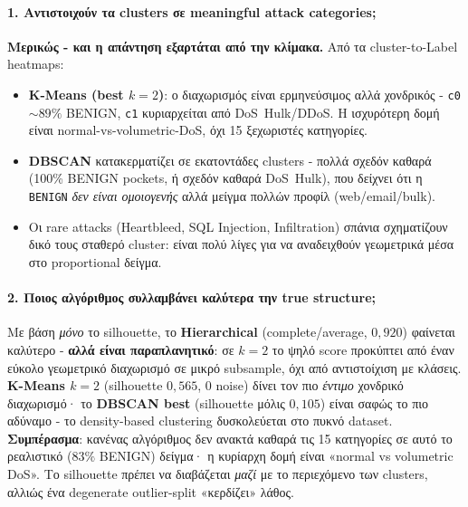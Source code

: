 \documentclass[12pt,a4paper,twoside]{book}
\begin{document}
\paragraph{1. Αντιστοιχούν τα clusters σε meaningful attack categories;}
\textbf{Μερικώς - και η απάντηση εξαρτάται από την κλίμακα.} Από τα
cluster-to-Label heatmaps:
\begin{itemize}
    \item \textbf{K-Means (best \(k=2\))}: ο διαχωρισμός είναι
    ερμηνεύσιμος αλλά χονδρικός - \texttt{c0} \(\sim 89\%\) BENIGN, \texttt{c1}
    κυριαρχείται από DoS~Hulk/DDoS. Η ισχυρότερη δομή είναι
    normal-vs-volumetric-DoS, όχι 15 ξεχωριστές κατηγορίες.
    \item \textbf{DBSCAN} κατακερματίζει σε εκατοντάδες clusters - πολλά
    σχεδόν καθαρά (100\% BENIGN pockets, ή σχεδόν καθαρά DoS~Hulk), που
    δείχνει ότι η \texttt{BENIGN} \emph{δεν είναι ομοιογενής} αλλά μείγμα
    πολλών προφίλ (web/email/bulk).
    \item Οι rare attacks (Heartbleed, SQL Injection, Infiltration)
    σπάνια σχηματίζουν δικό τους σταθερό cluster: είναι πολύ λίγες για να
    αναδειχθούν γεωμετρικά μέσα στο proportional δείγμα.
\end{itemize}

\paragraph{2. Ποιος αλγόριθμος συλλαμβάνει καλύτερα την true structure;}
Με βάση \emph{μόνο} το silhouette, το \textbf{Hierarchical}
(complete/average, \(0{,}920\)) φαίνεται καλύτερο - \textbf{αλλά είναι
παραπλανητικό}: σε \(k=2\) το ψηλό score προκύπτει από έναν εύκολο
γεωμετρικό διαχωρισμό σε μικρό subsample, όχι από αντιστοίχιση με κλάσεις.
\textbf{K-Means \(k=2\)} (silhouette \(0{,}565\), 0 noise) δίνει τον πιο
\emph{έντιμο} χονδρικό διαχωρισμό· το \textbf{DBSCAN best} (silhouette
μόλις \(0{,}105\)) είναι σαφώς το πιο αδύναμο - το density-based clustering
δυσκολεύεται στο πυκνό dataset. \textbf{Συμπέρασμα}: κανένας αλγόριθμος δεν
ανακτά καθαρά τις 15 κατηγορίες σε αυτό το ρεαλιστικό (\(83\%\) BENIGN)
δείγμα· η κυρίαρχη δομή είναι «normal vs volumetric DoS». Το silhouette
πρέπει να διαβάζεται \emph{μαζί} με το περιεχόμενο των clusters, αλλιώς ένα
degenerate outlier-split «κερδίζει» λάθος.
\end{document}
